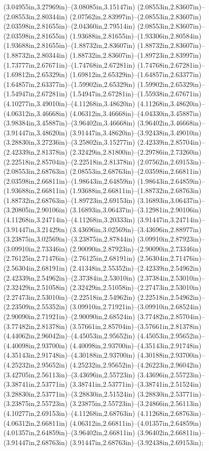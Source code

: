 (3.04955in,3.27969in)--(3.08085in,3.15147in) (2.08553in,2.83607in)--(2.08553in,2.80344in) (2.07562in,2.83997in)--(2.08553in,2.83607in) (2.03598in,2.81655in)--(2.04360in,2.79514in) (2.08553in,2.83607in)--(2.03598in,2.81655in) (1.93688in,2.81655in)--(1.93306in,2.80584in) (1.93688in,2.81655in)--(1.88732in,2.83607in) (1.88732in,2.83607in)--(1.88732in,2.80344in) (1.88732in,2.83607in)--(1.89723in,2.83997in) (1.73777in,2.67671in)--(1.74768in,2.67281in) (1.74768in,2.67281in)--(1.69812in,2.65329in) (1.69812in,2.65329in)--(1.64857in,2.63377in) (1.64857in,2.63377in)--(1.59902in,2.65329in) (1.59902in,2.65329in)--(1.54947in,2.67281in) (1.54947in,2.67281in)--(1.55938in,2.67671in) (4.10277in,3.49010in)--(4.11268in,3.48620in) (4.11268in,3.48620in)--(4.06312in,3.46668in) (4.06312in,3.46668in)--(4.04330in,3.45887in) (3.98384in,3.45887in)--(3.96402in,3.46668in) (3.96402in,3.46668in)--(3.91447in,3.48620in) (3.91447in,3.48620in)--(3.92438in,3.49010in) (3.28830in,3.27236in)--(3.25802in,3.15277in) (2.42339in,2.85704in)--(2.42339in,2.81378in) (2.32429in,2.81800in)--(2.29786in,2.73260in) (2.22518in,2.85704in)--(2.22518in,2.81378in) (2.07562in,2.69153in)--(2.08553in,2.68763in) (2.08553in,2.68763in)--(2.03598in,2.66811in) (2.03598in,2.66811in)--(1.98643in,2.64859in) (1.98643in,2.64859in)--(1.93688in,2.66811in) (1.93688in,2.66811in)--(1.88732in,2.68763in) (1.88732in,2.68763in)--(1.89723in,2.69153in) (3.16893in,3.06437in)--(3.20805in,2.90106in) (3.16893in,3.06437in)--(3.12981in,2.90106in) (4.11268in,3.24714in)--(4.11268in,3.20333in) (3.91447in,3.24714in)--(3.91447in,3.21429in) (3.43696in,3.02569in)--(3.43696in,2.88977in) (3.23875in,3.02569in)--(3.23875in,2.87844in) (3.09910in,2.87923in)--(3.09910in,2.73346in) (2.90090in,2.87923in)--(2.90090in,2.73346in) (2.76125in,2.71476in)--(2.76125in,2.68191in) (2.56304in,2.71476in)--(2.56304in,2.68191in) (2.41348in,2.55352in)--(2.42339in,2.54962in) (2.42339in,2.54962in)--(2.37384in,2.53010in) (2.37384in,2.53010in)--(2.32429in,2.51058in) (2.32429in,2.51058in)--(2.27473in,2.53010in) (2.27473in,2.53010in)--(2.22518in,2.54962in) (2.22518in,2.54962in)--(2.23509in,2.55352in) (3.09910in,2.71921in)--(3.09910in,2.68524in) (2.90090in,2.71921in)--(2.90090in,2.68524in) (3.77482in,2.85704in)--(3.77482in,2.81378in) (3.57661in,2.85704in)--(3.57661in,2.81378in) (4.44062in,2.96042in)--(4.45053in,2.95652in) (4.45053in,2.95652in)--(4.40098in,2.93700in) (4.40098in,2.93700in)--(4.35143in,2.91748in) (4.35143in,2.91748in)--(4.30188in,2.93700in) (4.30188in,2.93700in)--(4.25232in,2.95652in) (4.25232in,2.95652in)--(4.26223in,2.96042in) (3.42705in,2.56113in)--(3.43696in,2.55723in) (3.43696in,2.55723in)--(3.38741in,2.53771in) (3.38741in,2.53771in)--(3.38741in,2.51524in) (3.28830in,2.53771in)--(3.28830in,2.51524in) (3.28830in,2.53771in)--(3.23875in,2.55723in) (3.23875in,2.55723in)--(3.24866in,2.56113in) (4.10277in,2.69153in)--(4.11268in,2.68763in) (4.11268in,2.68763in)--(4.06312in,2.66811in) (4.06312in,2.66811in)--(4.01357in,2.64859in) (4.01357in,2.64859in)--(3.96402in,2.66811in) (3.96402in,2.66811in)--(3.91447in,2.68763in) (3.91447in,2.68763in)--(3.92438in,2.69153in);
